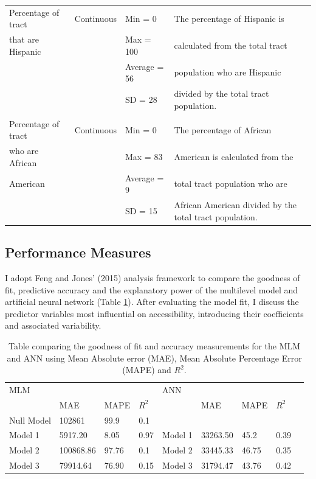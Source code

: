 \documentclass[a4paper,UKenglish]{lipics-v2018}
\begin{document}
\begin{center}
\begin{table}
\begin{tabular}{p{3cm}p{1.6cm}p{2.5cm}p{5cm}}
 Percentage of tract & Continuous & Min = 0 & The percentage of Hispanic is \\
 that are Hispanic & & Max = 100 & calculated from the total tract\\
 & & Average = 56 & population who are Hispanic \\
 & & SD  = 28 & divided by the total tract population.\\ \\
 \hline
 Percentage of tract & Continuous & Min = 0 & The percentage of African \\
 who are African  & & Max = 83 & American is calculated from the  \\
 American & & Average = 9 & total tract population who are \\
 & & SD = 15 & African American divided by the total tract population.\\
 \bottomrule
\end{tabular}
\end{table}
\end{center}

\doublespacing
\subsection{Performance Measures}
I adopt Feng and Jones' (2015) analysis framework to compare the goodness of fit, predictive accuracy and the explanatory power of the multilevel model and artificial neural network ({Table \ref{tab:table3}}). After evaluating the model fit, I discuss the predictor variables most influential on accessibility, introducing their coefficients and associated variability. 
\begin{center}
\begin{table}
\caption[Table 3] {\label{tab:table3} Table comparing the goodness of fit and accuracy measurements for the MLM and ANN using Mean Absolute error (MAE), Mean Absolute Percentage Error (MAPE) and $R^2$.} 
\begin{tabular}{p{2cm}p{1.6cm}p{1.2cm}p{0.9cm}p{1.2cm}p{1.6cm}p{1.2cm}p{0.9cm}}
 \toprule
MLM & \multicolumn{3}{c}{} & ANN & \multicolumn{4}{c}{} \\ \cline{2-4} \cline{6-8} 
        &  MAE  & MAPE & $R^2$        &             
	&  MAE  & MAPE & $R^2$                                                  \\    \hline
 Null Model   &  102861      &  99.9  &  0.1   &             &            &         &          \\     
 Model 1       &  5917.20     &  8.05  &  0.97  &  Model 1  &  33263.50  &  45.2   &   0.39   \\     
 Model 2       &  100868.86   &  97.76 &  0.1   &  Model 2  &  33445.33  &  46.75  &   0.35   \\
 Model 3       &  79914.64    &  76.90 &  0.15  &  Model 3  &  31794.47  &  43.76  &   0.42   \\
 \bottomrule
\end{tabular}
\end{table}

\end{center}
\end{document}
